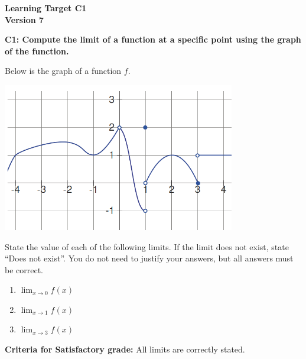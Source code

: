 \documentclass[10pt]{article}
\begin{document}
	\vspace*{0in}

		\begin{center}
			\textbf{Learning Target C1 \\
			Version 7} \\
		\end{center}


\begin{framed}
	\textbf{C1: Compute the limit of a function at a specific point using the graph of the function. }
\end{framed}

Below is the graph of a function $f$. 

\begin{center}
    \includegraphics[width=4in]{limits-oct16.png}
\end{center}

State the value of each of the following limits. If the limit does not exist, state ``Does not exist''. You do not need to justify your answers, but all answers must be correct. 

\begin{enumerate}
    \item $\displaystyle{\lim_{x \to 0} f(x)}$
    \item $\displaystyle{\lim_{x \to 1} f(x)}$
    \item $\displaystyle{\lim_{x \to 3} f(x)}$
\end{enumerate}


\vfill


\begin{small}
    \begin{framed}
        	\textbf{Criteria for Satisfactory grade:} All limits are correctly stated.
    \end{framed}

\end{small}
\end{document}
